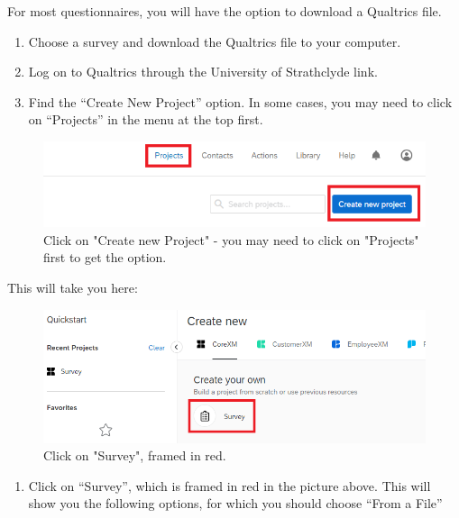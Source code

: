 \documentclass[
]{book}
\providecommand{\tightlist}{%
  \setlength{\itemsep}{0pt}\setlength{\parskip}{0pt}}
\begin{document}
For most questionnaires, you will have the option to download a Qualtrics file.

\begin{enumerate}
\def\labelenumi{\arabic{enumi}.}
\tightlist
\item
  Choose a survey and download the Qualtrics file to your computer.
\item
  Log on to Qualtrics through the University of Strathclyde link.
\item
  Find the ``Create New Project'' option. In some cases, you may need to click on ``Projects'' in the menu at the top first.
\end{enumerate}

\begin{figure}

{\centering \includegraphics[width=0.85\linewidth]{images/Qualtrics/02NewProject} 

}

\caption{Click on "Create new Project" - you may need to click on "Projects" first to get the option.}\label{fig:Figure11-2}
\end{figure}

This will take you here:

\begin{figure}

{\centering \includegraphics[width=0.85\linewidth]{images/Qualtrics/03NewProject2} 

}

\caption{Click on "Survey", framed in red.}\label{fig:Figure11-3}
\end{figure}

\begin{enumerate}
\def\labelenumi{\arabic{enumi}.}
\setcounter{enumi}{3}
\tightlist
\item
  Click on ``Survey'', which is framed in red in the picture above. This will show you the following options, for which you should choose ``From a File''
\end{enumerate}
\end{document}
